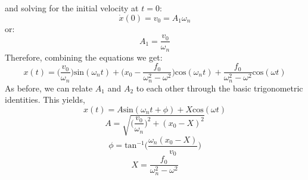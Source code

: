 \documentclass[12pt,letter]{article}
\numberwithin{ex}{section} %
\numberwithin{re}{section} %
\begin{document}
			and solving for the initial velocity at $t=0$:
			\begin{equation}
				\dot{x}(0) = v_0 =  A_1 \omega_n
			\end{equation}				
			or:
			\begin{equation}
				A_1 = \frac{v_0}{\omega_n}
			\end{equation}				
			Therefore, combining the equations we get:
			\begin{equation}
				x(t) = \Big(\frac{v_0}{\omega_n}\Big)\text{sin}(\omega_n t) + \Big(x_0-\frac{f_0}{\omega_n^2-\omega^2}\Big)\text{cos}(\omega_n t) + \frac{f_0}{\omega_n^2-\omega^2}\text{cos}(\omega t)
			\end{equation}	
			As before, we can relate $A_1$ and $A_2$ to each other through the basic trigonometric identities. This yields, 
			\begin{equation}
				x(t) = A\text{sin}(\omega_n t + \phi) + X\text{cos}(\omega t) 
			\end{equation}				
			\begin{equation}
				A = \sqrt{\bigg(\frac{v_0}{\omega_n}\bigg)^2+(x_0-X)^2}
			\end{equation}				
			\begin{equation}
				\phi = \text{tan}^{-1}\bigg(\frac{\omega_n(x_0-X)}{v_0}\bigg)
			\end{equation}				
			\begin{equation}
				X = \frac{f_0}{\omega_n^2-\omega^2}
			\end{equation}				
			
\end{document}
